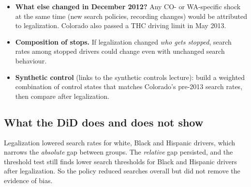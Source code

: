 \documentclass[11pt]{article}
\newcommand{\1}{\mathbf{1}}
\begin{document}
\begin{itemize}
\begin{itemize}
  \end{itemize}
  \item \textbf{What else changed in December 2012?} Any CO- or WA-specific shock at the same time (new search policies, recording changes) would be attributed to legalization. Colorado also passed a THC driving limit in May 2013.
  \item \textbf{Composition of stops.} If legalization changed \emph{who gets stopped}, search rates among stopped drivers could change even with unchanged search behaviour.
  \item \textbf{Synthetic control} (links to the synthetic controls lecture): build a weighted combination of control states that matches Colorado's pre-2013 search rates, then compare after legalization.
\end{itemize}

\subsection{What the DiD does and does not show}
Legalization lowered search rates for white, Black and Hispanic drivers, which narrows the \emph{absolute} gap between groups. The \emph{relative} gap persisted, and the threshold test still finds lower search thresholds for Black and Hispanic drivers after legalization. So the policy reduced searches overall but did not remove the evidence of bias.
\end{document}
